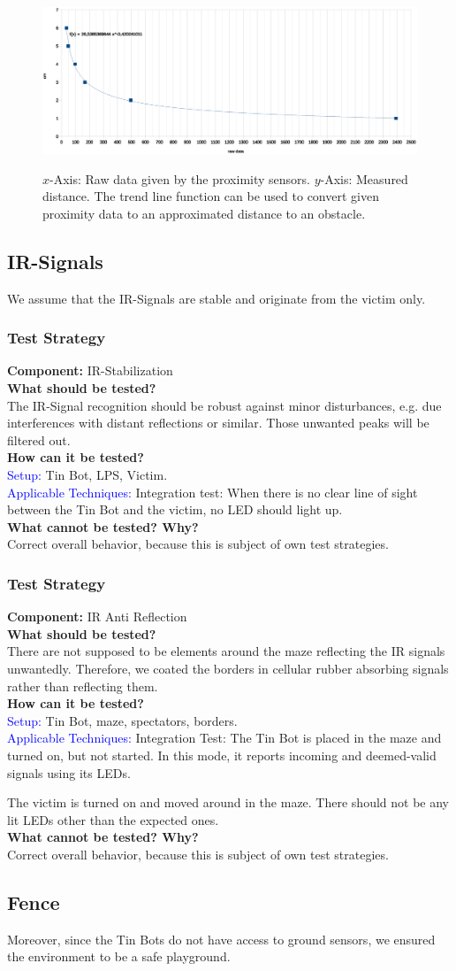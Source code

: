 \documentclass[a4paper,parskip,headheight=38pt]{scrartcl} %
\newcommand{\teststrat}[5]{
    \subsubsection{Test Strategy}
	\textbf{Component:} #1 \\
	\noindent\textbf{What should be tested?} \\
    \noindent #2 \\
	\noindent\textbf{How can it be tested?} \\
    \noindent\textcolor{blue}{Setup:} #3 \\
    \noindent\textcolor{blue}{Applicable Techniques:} #4 \\
	\noindent\textbf{What cannot be tested? Why?} \\
    \noindent #5
}
\begin{document}
\begin{figure}[t]
\noindent\includegraphics[width=\textwidth]{Proximitygraph.eps}
\label{fig:proxdata}
\caption{$x$-Axis: Raw data given by the proximity sensors. $y$-Axis: Measured
distance. The trend line function can be used to convert given proximity data
to an approximated distance to an obstacle.}
\end{figure}

\subsection{IR-Signals}
We assume that the IR-Signals are stable and originate from the victim only.

\teststrat{IR-Stabilization}{
    The IR-Signal recognition should be robust against minor disturbances, e.g.
    due interferences with distant reflections or similar.
    Those unwanted peaks will be filtered out.
}{
    Tin Bot, LPS, Victim.
}{
    Integration test: When there is no clear line of sight between the Tin Bot
    and the victim, no LED should light up.
}{
    Correct overall behavior, because this is subject of own test strategies.
}

\teststrat{IR Anti Reflection}{
    There are not supposed to be elements around the maze reflecting the IR
    signals unwantedly. Therefore, we coated the borders in cellular rubber
    absorbing signals rather than reflecting them. 
}{
    Tin Bot, maze, spectators, borders.
}{
    Integration Test: 
    The Tin Bot is placed in the maze and turned on, but not
    started. In this mode, it reports incoming and deemed-valid signals using
    its LEDs. 

    The victim is turned on and moved around in the maze. There should not be
    any lit LEDs other than the expected ones.
}{
    Correct overall behavior, because this is subject of own test strategies.
}

\subsection{Fence}
Moreover, since the Tin Bots do not have access to ground sensors, we ensured
the environment to be a safe playground.
\end{document}
